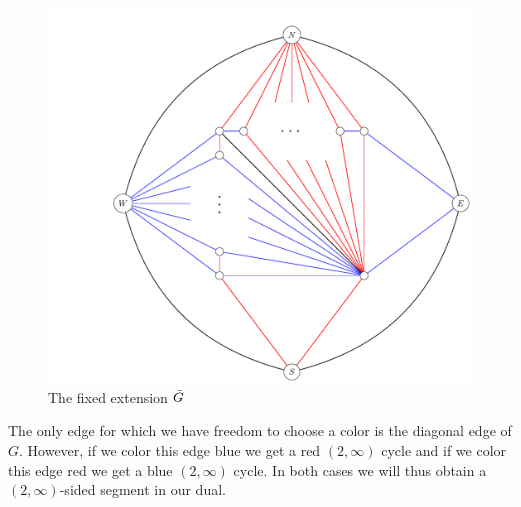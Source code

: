 \begin{figure}[h!]
\centering
\includegraphics[scale=.5]{prelim/img/2manysidedLowerBound}

\caption{The fixed extension $\bar{G}$
    \label{fig:2manysidedLowerBound}}
\end{figure}

The only edge for which we have freedom to choose a color is the diagonal edge of $G$. However, if we color this edge blue we get a red $(2, \infty)$ cycle and if we color this edge red we get a blue $(2, \infty)$ cycle. In both cases we will thus obtain a $(2,\infty)$-sided segment in our dual.
